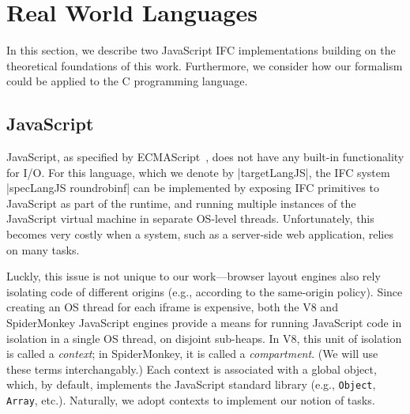 \section{Real World Languages}
\label{sec:real}

In this section, we describe two JavaScript IFC implementations
building on the theoretical foundations of this work.
%
Furthermore, we consider how our formalism could be applied to the C
programming language.
%
%


\subsection{JavaScript}
\label{sec:real:js}

JavaScript, as specified by
ECMAScript~\cite{ecma}, does not have any built-in
functionality for I/O.
%
For this language, which we denote by |targetLangJS|, the IFC system
|specLangJS roundrobinf| can be implemented by exposing IFC primitives
to JavaScript as part of the runtime, and running multiple instances
of the JavaScript virtual machine in separate OS-level threads.
%
Unfortunately, this becomes very costly when a system, such as a
server-side web application, relies on many tasks.
%

Luckly, this issue is not unique to our work---browser layout engines
also rely isolating code of different origins (e.g., according to the
same-origin policy).
%
Since creating an OS thread for each iframe is expensive, both
the V8 and SpiderMonkey JavaScript engines provide a means for running
JavaScript code in isolation in a single OS thread,
on disjoint sub-heaps.
%
In V8, this unit of isolation is called a \emph{context}; in
SpiderMonkey, it is called a \emph{compartment}.
%
(We will use these terms interchangably.)
%
Each context is associated with a global object, which, by
default, implements the JavaScript standard library (e.g.,
\verb|Object|, \verb|Array|, etc.).
%
Naturally, we adopt contexts to implement our notion of tasks.


